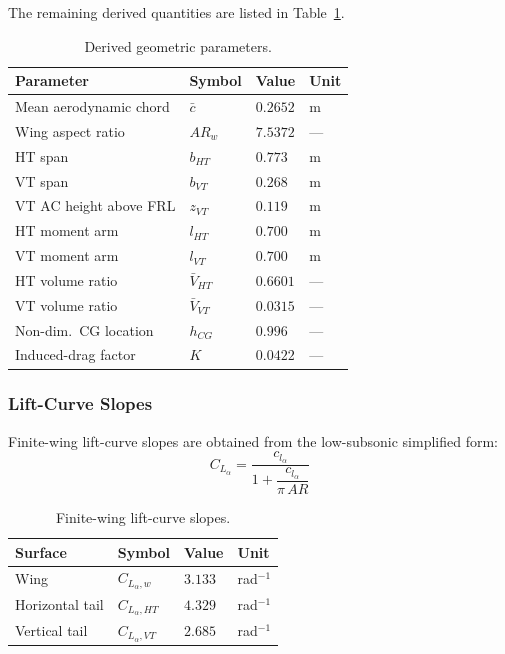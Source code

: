 The remaining derived quantities are listed in Table~\ref{tab:derived_geometry}.

\begin{table}[H]
  \centering
  \caption{Derived geometric parameters.}
  \label{tab:derived_geometry}
  \begin{tabular}{llll}
    \toprule
    \textbf{Parameter} & \textbf{Symbol} & \textbf{Value} & \textbf{Unit} \\
    \midrule
    Mean aerodynamic chord      & $\bar{c}$      & $0.2652$  & m \\
    Wing aspect ratio           & $AR_w$         & $7.5372$  & --- \\
    HT span                     & $b_{HT}$       & $0.773$   & m \\
    VT span                     & $b_{VT}$       & $0.268$   & m \\
    VT AC height above FRL      & $z_{VT}$       & $0.119$   & m \\
    HT moment arm               & $l_{HT}$       & $0.700$   & m \\
    VT moment arm               & $l_{VT}$       & $0.700$   & m \\
    HT volume ratio             & $\bar{V}_{HT}$ & $0.6601$  & --- \\
    VT volume ratio             & $\bar{V}_{VT}$ & $0.0315$  & --- \\
    Non-dim.\ CG location       & $h_{CG}$       & $0.996$   & --- \\
    Induced-drag factor         & $K$            & $0.0422$  & --- \\
    \bottomrule
  \end{tabular}
\end{table}

\subsubsection{Lift-Curve Slopes}

Finite-wing lift-curve slopes are obtained from the low-subsonic simplified form:
\begin{equation}
  C_{L_\alpha} = \frac{c_{l_\alpha}}{1 + \dfrac{c_{l_\alpha}}{\pi\, AR}}
  \label{eq:CLalpha}
\end{equation}

\begin{table}[H]
  \centering
  \caption{Finite-wing lift-curve slopes.}
  \label{tab:liftcurve}
  \begin{tabular}{llll}
    \toprule
    \textbf{Surface} & \textbf{Symbol} & \textbf{Value} & \textbf{Unit} \\
    \midrule
    Wing            & $C_{L_\alpha,w}$   & $3.133$ & rad$^{-1}$ \\
    Horizontal tail & $C_{L_\alpha,HT}$  & $4.329$ & rad$^{-1}$ \\
    Vertical tail   & $C_{L_\alpha,VT}$  & $2.685$ & rad$^{-1}$ \\
    \bottomrule
  \end{tabular}
\end{table}

